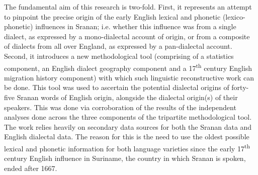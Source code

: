 \begin{refsection}

The fundamental aim of this research is two-fold. First, it represents an attempt to pinpoint the precise origin of the early English lexical and phonetic (lexico-phonetic) influences in Sranan; i.e. whether this influence was from a single dialect, as expressed by a mono-dialectal account of origin, or from a composite of dialects from all over England, as expressed by a pan-dialectal account. Second, it introduces a new methodological tool (comprising of a statistics component, an English dialect geography component and a 17\textsuperscript{th} century English migration history component) with which such linguistic reconstructive work can be done. This tool was used to ascertain the potential dialectal origins of forty-five Sranan words of English origin, alongside the dialectal origin(s) of their speakers. This was done via corroboration of the results of the independent analyses done across the three components of the tripartite methodological tool. The work relies heavily on secondary data sources for both the Sranan data and English dialectal data. The reason for this is the need to use the oldest possible lexical and phonetic information for both language varieties since the early 17\textsuperscript{th} century English influence in Suriname, the country in which Sranan is spoken, ended after 1667.
\printbibliography[heading=subbibliography]
\end{refsection}

